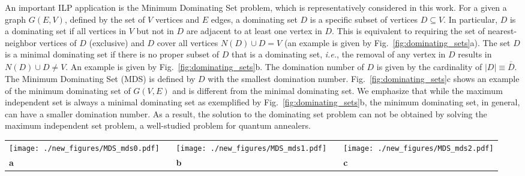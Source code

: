 \documentclass[prd,twocolumn,tightenlines,preprintnumbers,showpacs,superscriptaddress,notitlepage,nofootinbib,eqsecnum,floatfix,longbibliography,aps,10pt]{revtex4-2}
\begin{document}
An important ILP application is the Minimum Dominating Set problem, which is representatively considered in this work.
For a given a graph $G(E,V)$, defined by the set of $V$ vertices and $E$ edges, a dominating set $D$ is a specific subset of vertices $D \subseteq V$.
In particular, $D$ is a dominating set if all vertices in $V$ but not in $D$ are adjacent to at least one vertex in $D$.
This is equivalent to requiring the set of nearest-neighbor vertices of $D$ (exclusive) and $D$ cover all vertices $N(D) \cup D = V$ (an example is given by Fig.~\ref{fig:dominating_sets}a).
The set $D$ is a minimal dominating set if there is no proper subset of $D$ that is a dominating set, {\it{i.e.}}, the removal of any vertex in $D$ results in $N(D) \cup D  \neq V$.
An example is given by Fig.~\ref{fig:dominating_sets}b.
The domination number of $D$ is given by the cardinality of $|D| \equiv \overline{\overline{D}}$.
The Minimum Dominating Set (MDS) is defined by $D$ with the smallest domination number.
Fig.~\ref{fig:dominating_sets}c shows an example of the minimum dominating set of $G(V, E)$ and is different from the minimal dominating set.
We emphasize that while the maximum independent set is always a minimal dominating set as exemplified by Fig.~\ref{fig:dominating_sets}b, the minimum dominating set, in general, can have a smaller domination number.
As a result, the solution to the dominating set problem can not be obtained by solving the maximum independent set problem, a well-studied problem for quantum annealers.

\begin{figure*}
	\centering
	\begin{tabular}{p{}p{}p{}p{}p{}}
	\texttt{[image: ./new\_figures/MDS\_mds0.pdf]}
&&
	\texttt{[image: ./new\_figures/MDS\_mds1.pdf]}
&&
	\texttt{[image: ./new\_figures/MDS\_mds2.pdf]}\\
	\centering\textbf{a} && \centering\textbf{b} && \centering\textbf{c}
	\end{tabular}
	\caption{Example of different dominating sets for $G(V, E)$. Vertices in the dominating set $D$ are highlighted in blue. {\textbf{a)}} A dominating set of $G$ with domination number $\overline{\overline{D}} = 2$. {\textbf{b)}} A minimal dominating set of $G$ with domination number of $\overline{\overline{D}} = 2$. {\textbf{c)}} The minimum dominating set of $G$ with domination number of $\overline{\overline{D}} = 1$.}
	\label{fig:dominating_sets}
\end{figure*}
\end{document}
